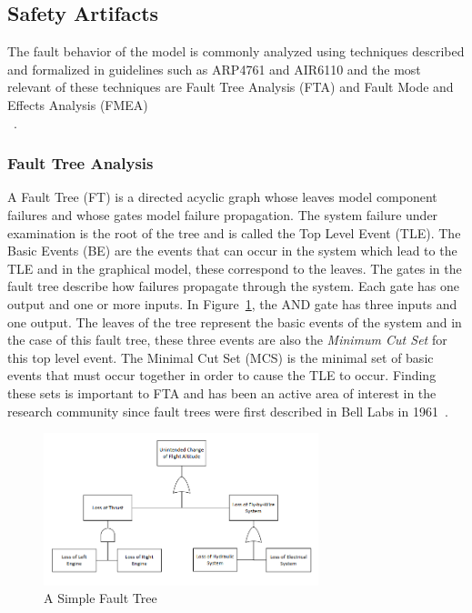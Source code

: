\subsection{Safety Artifacts}
\label{subsec:safety_artifacts}

The fault behavior of the model is commonly analyzed using techniques described and formalized in guidelines such as ARP4761 and AIR6110 and the most relevant of these techniques are Fault Tree Analysis (FTA) and Fault Mode and Effects Analysis (FMEA)\\~\cite{SAE:ARP4761, AIR6110, 0f356f05e72f43018211b36f97c8854a, Bozzano:2010:DSA:1951720}. 

\subsubsection{Fault Tree Analysis}
A Fault Tree (FT) is a directed acyclic graph whose leaves model component failures and whose gates model failure propagation. The system failure under examination is the root of the tree and is called the Top Level Event (TLE). The Basic Events (BE) are the events that can occur in the system which lead to the TLE and in the graphical model, these correspond to the leaves. The gates in the fault tree describe how failures propagate through the system. Each gate has one output and one or more inputs. In Figure~\ref{fig:introFT}, the AND gate has three inputs and one output. The leaves of the tree represent the basic events of the system and in the case of this fault tree, these three events are also the \textit{Minimum Cut Set} for this top level event. The Minimal Cut Set (MCS) is the minimal set of basic events that must occur together in order to cause the TLE to occur. Finding these sets is important to FTA and has been an active area of interest in the research community since fault trees were first described in Bell Labs in 1961~\cite{historyFTA, 0f356f05e72f43018211b36f97c8854a}. 

\begin{figure}[h]
\begin{center}
\includegraphics[width=8cm]{images/ft.png}
\caption{A Simple Fault Tree} \label{fig:introFT}
\end{center}
\end{figure}

